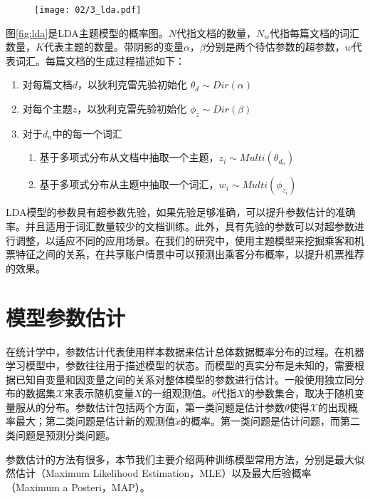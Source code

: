 \begin{figure}
 \centering
 \texttt{[image: 02/3\_lda.pdf]}
\end{figure}

图\ref{fig:lda}是LDA主题模型的概率图。$N$代指文档的数量，$N_w$代指每篇文档的词汇数量，$K$代表主题的数量。带阴影的变量$\alpha$，$\beta$分别是两个待估参数的超参数，$w$代表词汇。每篇文档的生成过程描述如下：

\begin{enumerate}
\item 对每篇文档$d$，以狄利克雷先验初始化 $\theta_d \sim Dir(\alpha)$
\item 对每个主题$z$，以狄利克雷先验初始化 $\phi_z \sim Dir(\beta)$
\item 对于$d_n$中的每一个词汇
       \begin{enumerate}[fullwidth,itemindent=1em,label=(\alph*)]
       \item 基于多项式分布从文档中抽取一个主题，$z_i \sim Multi(\theta_{d_n})$
       \item 基于多项式分布从主题中抽取一个词汇，$w_i \sim Multi(\phi_{z_i})$
       \end{enumerate}
\end{enumerate}

LDA模型的参数具有超参数先验，如果先验足够准确，可以提升参数估计的准确率。并且适用于词汇数量较少的文档训练。此外，具有先验的参数可以对超参数进行调整，以适应不同的应用场景。在我们的研究中，使用主题模型来挖掘乘客和机票特征之间的关系，在共享账户情景中可以预测出乘客分布概率，以提升机票推荐的效果。

\section{模型参数估计}

在统计学中，参数估计\parencite{heinrich2008parameter}代表使用样本数据来估计总体数据概率分布的过程。在机器学习模型中，参数往往用于描述模型的状态。而模型的真实分布是未知的，需要根据已知自变量和因变量之间的关系对整体模型的参数进行估计。一般使用独立同分布的数据集$\mathcal{X}$来表示随机变量$X$的一组观测值。$\theta$代指$X$的参数集合，取决于随机变量服从的分布。参数估计包括两个方面，第一类问题是估计参数$\theta$使得$\mathcal{X}$的出现概率最大；第二类问题是估计新的观测值$\tilde{x}$的概率。第一类问题是估计问题，而第二类问题是预测分类问题。

参数估计的方法有很多，本节我们主要介绍两种训练模型常用方法，分别是最大似然估计（Maximum Likelihood Estimation，MLE）\parencite{johansen1990maximum}以及最大后验概率（Maximum a Posteri，MAP）\parencite{gauvain1994maximum}。

